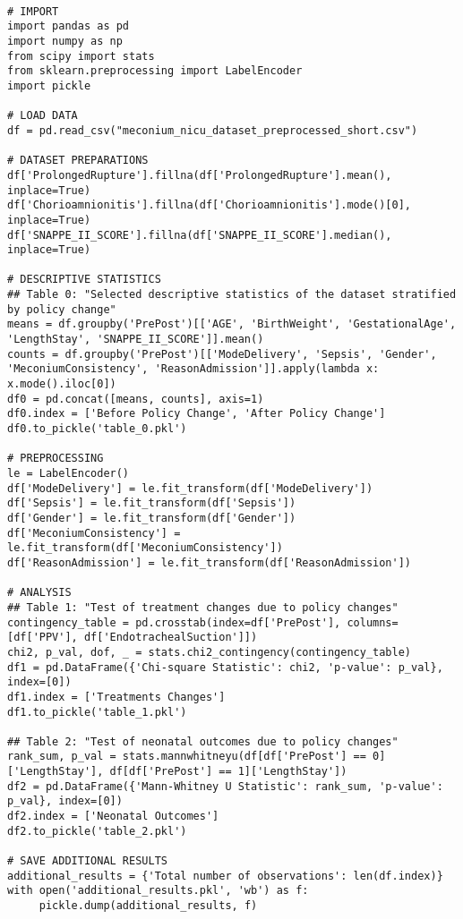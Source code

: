 \documentclass[11pt]{article}
\begin{document}
\begin{verbatim}

# IMPORT
import pandas as pd
import numpy as np
from scipy import stats
from sklearn.preprocessing import LabelEncoder
import pickle

# LOAD DATA
df = pd.read_csv("meconium_nicu_dataset_preprocessed_short.csv")

# DATASET PREPARATIONS
df['ProlongedRupture'].fillna(df['ProlongedRupture'].mean(), inplace=True)
df['Chorioamnionitis'].fillna(df['Chorioamnionitis'].mode()[0], inplace=True)
df['SNAPPE_II_SCORE'].fillna(df['SNAPPE_II_SCORE'].median(), inplace=True)

# DESCRIPTIVE STATISTICS
## Table 0: "Selected descriptive statistics of the dataset stratified by policy change"
means = df.groupby('PrePost')[['AGE', 'BirthWeight', 'GestationalAge', 'LengthStay', 'SNAPPE_II_SCORE']].mean()
counts = df.groupby('PrePost')[['ModeDelivery', 'Sepsis', 'Gender', 'MeconiumConsistency', 'ReasonAdmission']].apply(lambda x: x.mode().iloc[0])
df0 = pd.concat([means, counts], axis=1)
df0.index = ['Before Policy Change', 'After Policy Change']
df0.to_pickle('table_0.pkl')

# PREPROCESSING 
le = LabelEncoder()
df['ModeDelivery'] = le.fit_transform(df['ModeDelivery'])
df['Sepsis'] = le.fit_transform(df['Sepsis'])
df['Gender'] = le.fit_transform(df['Gender'])
df['MeconiumConsistency'] = le.fit_transform(df['MeconiumConsistency'])
df['ReasonAdmission'] = le.fit_transform(df['ReasonAdmission'])

# ANALYSIS
## Table 1: "Test of treatment changes due to policy changes"
contingency_table = pd.crosstab(index=df['PrePost'], columns=[df['PPV'], df['EndotrachealSuction']])
chi2, p_val, dof, _ = stats.chi2_contingency(contingency_table)
df1 = pd.DataFrame({'Chi-square Statistic': chi2, 'p-value': p_val}, index=[0])
df1.index = ['Treatments Changes']
df1.to_pickle('table_1.pkl')

## Table 2: "Test of neonatal outcomes due to policy changes"
rank_sum, p_val = stats.mannwhitneyu(df[df['PrePost'] == 0]['LengthStay'], df[df['PrePost'] == 1]['LengthStay'])
df2 = pd.DataFrame({'Mann-Whitney U Statistic': rank_sum, 'p-value': p_val}, index=[0])
df2.index = ['Neonatal Outcomes']
df2.to_pickle('table_2.pkl')

# SAVE ADDITIONAL RESULTS
additional_results = {'Total number of observations': len(df.index)}
with open('additional_results.pkl', 'wb') as f:
     pickle.dump(additional_results, f)

\end{verbatim}
\end{document}
